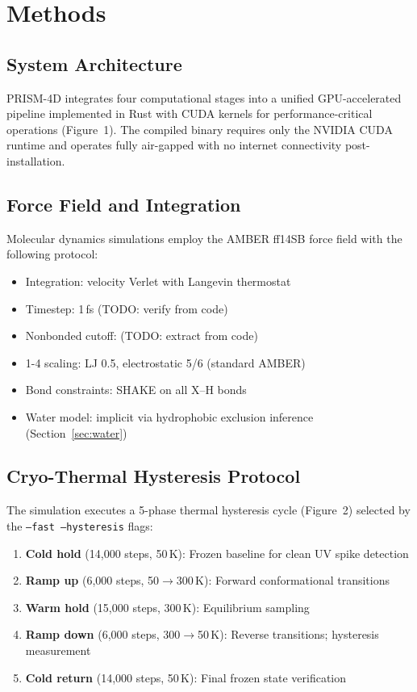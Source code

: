 \documentclass[11pt,twocolumn]{article}
\begin{document}
\section{Methods}

\subsection{System Architecture}

PRISM-4D integrates four computational stages into a unified GPU-accelerated pipeline
implemented in Rust with CUDA kernels for performance-critical operations (Figure~1). The
compiled binary requires only the NVIDIA CUDA runtime and operates fully air-gapped with no
internet connectivity post-installation.

\subsection{Force Field and Integration}

Molecular dynamics simulations employ the AMBER ff14SB force field \citep{maier2015} with
the following protocol:
\begin{itemize}
  \item Integration: velocity Verlet with Langevin thermostat \citep{izaguirre2001}
  \item Timestep: 1\,fs (TODO: verify from code)
  \item Nonbonded cutoff: (TODO: extract from code)
  \item 1-4 scaling: LJ 0.5, electrostatic 5/6 (standard AMBER)
  \item Bond constraints: SHAKE \citep{ryckaert1977} on all X--H bonds
  \item Water model: implicit via hydrophobic exclusion inference (Section~\ref{sec:water})
\end{itemize}

\subsection{Cryo-Thermal Hysteresis Protocol}
\label{sec:cryo}

The simulation executes a 5-phase thermal hysteresis cycle (Figure~2) selected by the
\texttt{--fast --hysteresis} flags:

\begin{enumerate}
  \item \textbf{Cold hold} (14{,}000 steps, 50\,K): Frozen baseline for clean UV spike detection
  \item \textbf{Ramp up} (6{,}000 steps, 50$\to$300\,K): Forward conformational transitions
  \item \textbf{Warm hold} (15{,}000 steps, 300\,K): Equilibrium sampling
  \item \textbf{Ramp down} (6{,}000 steps, 300$\to$50\,K): Reverse transitions; hysteresis measurement
  \item \textbf{Cold return} (14{,}000 steps, 50\,K): Final frozen state verification
\end{enumerate}
\end{document}
